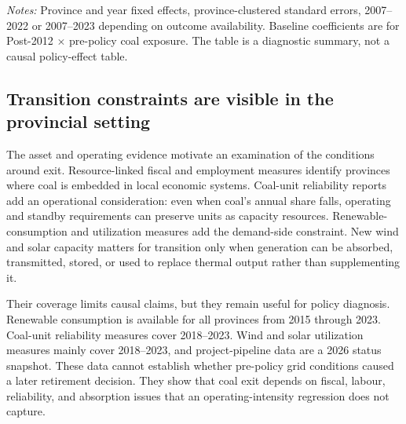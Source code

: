 \documentclass[11pt]{article}
\newcommand{\note}[1]{\begin{minipage}{0.96\textwidth}\footnotesize\textit{Notes:} #1\end{minipage}}
\begin{document}
\begin{table}[H]
\centering
\caption{Supporting provincial evidence: operating and compositional adjustment}
\label{tab:operating}
\note{Province and year fixed effects, province-clustered standard errors, 2007--2022 or 2007--2023 depending on outcome availability. Baseline coefficients are for Post-2012 $\times$ pre-policy coal exposure. The table is a diagnostic summary, not a causal policy-effect table.}
\end{table}

\subsection{Transition constraints are visible in the provincial setting}

The asset and operating evidence motivate an examination of the conditions around exit. Resource-linked fiscal and employment measures identify provinces where coal is embedded in local economic systems. Coal-unit reliability reports add an operational consideration: even when coal's annual share falls, operating and standby requirements can preserve units as capacity resources. Renewable-consumption and utilization measures add the demand-side constraint. New wind and solar capacity matters for transition only when generation can be absorbed, transmitted, stored, or used to replace thermal output rather than supplementing it.

Their coverage limits causal claims, but they remain useful for policy diagnosis. Renewable consumption is available for all provinces from 2015 through 2023. Coal-unit reliability measures cover 2018--2023. Wind and solar utilization measures mainly cover 2018--2023, and project-pipeline data are a 2026 status snapshot. These data cannot establish whether pre-policy grid conditions caused a later retirement decision. They show that coal exit depends on fiscal, labour, reliability, and absorption issues that an operating-intensity regression does not capture.
\end{document}
